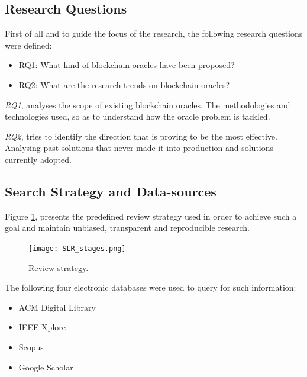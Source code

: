 \subsection{Research Questions}
First of all and to guide the focus of the research, the following research questions were defined:
\begin{itemize}
  \item RQ1: What kind of blockchain oracles have been proposed?
  \item RQ2: What are the research trends on blockchain oracles?
\end{itemize}

\textit{RQ1}, analyses the scope of existing blockchain oracles. The methodologies and technologies used, so as to understand how the oracle problem is tackled.

\textit{RQ2}, tries to identify the direction that is proving to be the most effective. Analysing past solutions that never made it into production and solutions currently adopted.

\subsection{Search Strategy and Data-sources}
Figure \ref{fig:/figures/SLR_stages}, presents the predefined review strategy used in order to achieve such a goal and maintain unbiased, transparent and reproducible research.





\begin{figure}[t]
  \begin{center}
    \leavevmode
    \texttt{[image: SLR\_stages.png]}
    \caption{Review strategy.}
    \label{fig:/figures/SLR_stages}
  \end{center}
\end{figure}


The following four electronic databases were used to query for such information:

\begin{itemize}
  \item ACM Digital Library
  \item IEEE Xplore
  \item Scopus
  \item Google Scholar
\end{itemize}



